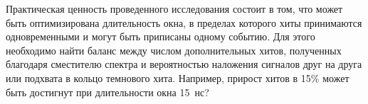 Практическая ценность проведенного исследования состоит в том, что может быть оптимизирована длительность окна, в пределах которого хиты принимаются одновременными и могут быть приписаны одному событию. Для этого необходимо найти баланс между числом дополнительных хитов, полученных благодаря сместителю спектра и вероятностью наложения сигналов друг на друга или подхвата в кольцо темнового хита.
Например, прирост хитов в 15\% может быть достигнут при длительности окна 15~нс?
